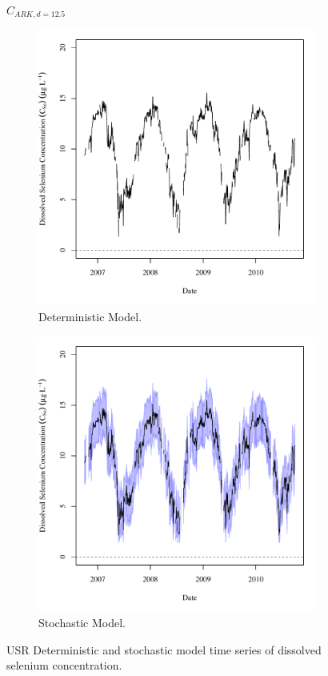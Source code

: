\subfiguremid
\begin{landscape}
	\begin{figure}
		$ C_{ARK,d=12.5} $
		\begin{subfigure}{0.7\textwidth}
			\centering
			\includegraphics[width=\tableCustomSize]{"Figures/Results_USR/Deterministic/c TS HOL"}
			\caption{Deterministic Model.}
		\end{subfigure}%
		\begin{subfigure}{0.7\textwidth}
			\centering
			\includegraphics[width=\tableCustomSize]{"Figures/Results_USR/Stochastic/c TS HOL"}
			\caption{Stochastic Model.}
		\end{subfigure}
		\caption{USR Deterministic and stochastic model time series of dissolved selenium concentration.}
	\end{figure}
\end{landscape}

